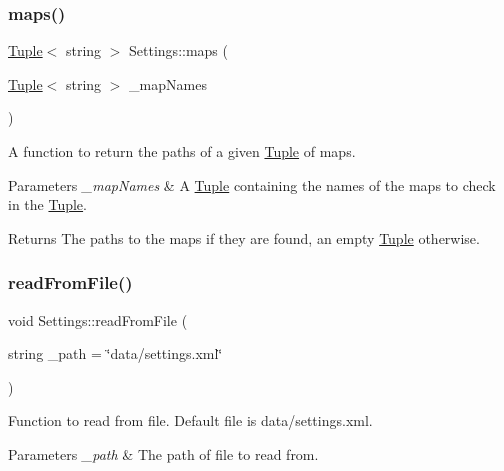 \subsubsection{\texorpdfstring{maps()}{maps()}\hspace{0.1cm}{\footnotesize\ttfamily [4/4]}}
{\footnotesize\ttfamily \mbox{\hyperlink{class_tuple}{Tuple}}$<$ string $>$ Settings\+::maps (\begin{DoxyParamCaption}\item[{\mbox{\hyperlink{class_tuple}{Tuple}}$<$ string $>$}]{\+\_\+map\+Names }\end{DoxyParamCaption})}



A function to return the paths of a given \mbox{\hyperlink{class_tuple}{Tuple}} of maps. 


\begin{DoxyParams}{Parameters}
{\em \+\_\+map\+Names} & A \mbox{\hyperlink{class_tuple}{Tuple}} containing the names of the maps to check in the \mbox{\hyperlink{class_tuple}{Tuple}}. \\
\hline
\end{DoxyParams}
\begin{DoxyReturn}{Returns}
The paths to the maps if they are found, an empty \mbox{\hyperlink{class_tuple}{Tuple}} otherwise. 
\end{DoxyReturn}
\mbox{\label{class_settings_a016ac9600bf42a2814847f14e5a3d58f}} 
\subsubsection{\texorpdfstring{readFromFile()}{readFromFile()}}
{\footnotesize\ttfamily void Settings\+::read\+From\+File (\begin{DoxyParamCaption}\item[{string}]{\+\_\+path = {\ttfamily \char`\"{}data/settings.xml\char`\"{}} }\end{DoxyParamCaption})}



Function to read from file. Default file is data/settings.\+xml. 


\begin{DoxyParams}{Parameters}
{\em \+\_\+path} & The path of file to read from. \\
\hline
\end{DoxyParams}
\mbox{\label{class_settings_a6e40d9eca9f6794dee65e519ea73bb24}} 
